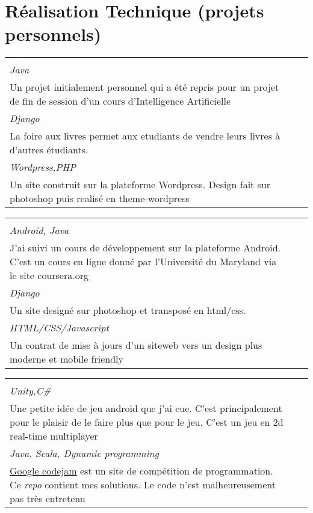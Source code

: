 \documentclass[a4paper,10pt]{extarticle}
\newcommand{\cvboxitem}[5]{}
\renewcommand{\cvboxitem}[5]{%
	\begin{minipage}[t]{\linewidth}
	
	$\bullet$ \textbf{#1}
	\ifthenelse{\equal{#2}{}}{}{, {\slshape #2}}\par%
	\raggedright{\scriptsize\href{#3}{#3}}\\
	{\small\slshape\color{Bittersweet} {#4}}\vspace{0.2em}\\
	{#5}

	\end{minipage}
	
}
\newcommand{\cvtriplebox}[3]{}
\renewcommand{\cvtriplebox}[3]{
\begin{tabular*}{\linewidth}{  
                   p{\dimexpr 0.33\linewidth-1\tabcolsep } 
                   p{\dimexpr 0.33\linewidth-1\tabcolsep }  
                   p{\dimexpr 0.33\linewidth-1\tabcolsep } 
                   } 
{#1}&{#2}&{#3}\tabularnewline
\end{tabular*}
}
\begin{document}
\vspace{-0.5em}
\section{Réalisation Technique \small(projets personnels)}

\cvtriplebox
{\cvboxitem{MineSweeper AI}{}{https://github.com/GitMyCode/Minesweeper-AI}{Java}
{Un projet initialement personnel qui a été repris pour un projet de fin de session d'un cours d'Intelligence Artificielle}}
{\cvboxitem{Encefal}{projet en collaboration}{http://foireauxlivres.uqam.ca/}{Django}
{La foire aux livres permet aux etudiants de vendre leurs livres à d'autres étudiants.}}
{
\cvboxitem{Site web}{abandonné}{www.courspiano.ca}{Wordpress,PHP}
{Un site construit sur la plateforme Wordpress. Design fait sur photoshop puis realisé en theme-wordpress}
}



\cvtriplebox
{\cvboxitem{Programming Mobile Applications for Android Handheld Systems}{}{https://class.coursera.org/android-001}{Android, Java}
{J'ai suivi un cours de développement sur la plateforme Android. C'est un cours en ligne donné par l'Université du Maryland via le site coursera.org}
}
{\cvboxitem{Site web}{abandonné}{http://coursmusique.codefaction.webfactional.com}{Django}
{Un site designé sur photoshop et transposé en html/css.}}
{
\cvboxitem{Site Web}{contrat}{http://gitmycode.github.io/avocatmontreal/}{ HTML/CSS/Javascript}
{Un contrat de mise à jours d'un siteweb vers un design plus moderne et mobile friendly }
}
\cvtriplebox
{\cvboxitem{Android Game}{en cours}{https://github.com/GitMyCode/laser-game}{Unity,C\#}{Une petite idée de jeu android que j'ai eue. C'est principalement pour le plaisir de le faire plus que pour le jeu. C'est un jeu en 2d real-time multiplayer}}
{\cvboxitem{Google Codejam}{}{https://github.com/GitMyCode/code-jam}{Java, Scala, Dynamic programming}
{\href{https://code.google.com/codejam}{Google codejam} est un site de compétition de programmation. Ce \emph{repo} contient mes solutions. Le code n'est malheureusement pas très entretenu }}

{}



\vspace{-2em}
\end{document}
